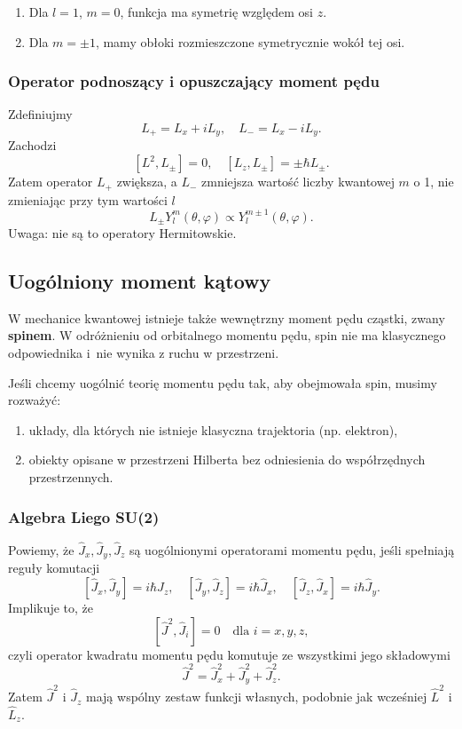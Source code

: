 \begin{enumerate}
\item Dla $l=1$, $m=0$, funkcja ma symetrię względem osi $z$.
\item Dla $m = \pm 1$, mamy obłoki rozmieszczone symetrycznie wokół tej osi.
\end{enumerate}

\subsubsection*{Operator podnoszący i opuszczający moment pędu}
Zdefiniujmy
$$
L_+ = L_x + iL_y, \quad L_- = L_x - iL_y.
$$
Zachodzi
$$
[L^2, L_{\pm}] = 0, \quad [L_z, L_{\pm}] = \pm \hbar L_{\pm}.
$$
Zatem operator $L_+$ zwiększa, a $L_-$ zmniejsza wartość liczby kwantowej $m$ o 1, nie zmieniając przy tym wartości $l$
$$
L_{\pm} Y_l^m(\theta, \varphi) \propto Y_l^{m \pm 1}(\theta, \varphi).
$$
Uwaga: nie są to operatory Hermitowskie.

\subsection{Uogólniony moment kątowy}
W mechanice kwantowej istnieje także wewnętrzny moment pędu cząstki, zwany \textbf{spinem}. W odróżnieniu od orbitalnego momentu pędu, spin nie ma klasycznego odpowiednika i~nie wynika z ruchu w przestrzeni.

Jeśli chcemy uogólnić teorię momentu pędu tak, aby obejmowała spin, musimy rozważyć:
\begin{enumerate}
\item układy, dla których nie istnieje klasyczna trajektoria (np. elektron),
\item obiekty opisane w przestrzeni Hilberta bez odniesienia do współrzędnych przestrzennych.
\end{enumerate}

\subsubsection*{Algebra Liego SU(2)}
Powiemy, że $\hat{J}_x, \hat{J}_y, \hat{J}_z$ są uogólnionymi operatorami
momentu pędu, jeśli spełniają reguły komutacji
$$
[\hat{J}_x, \hat{J}_y] = i\hbar \hat{J}_z, \quad [\hat{J}_y, \hat{J}_z] = i\hbar \hat{J}_x, \quad [\hat{J}_z, \hat{J}_x] = i\hbar \hat{J}_y.
$$
Implikuje to, że
$$
[\hat{J}^2, \hat{J}_i] = 0 \quad \text{dla } i = x, y, z,
$$
czyli operator kwadratu momentu pędu komutuje ze wszystkimi jego składowymi
$$
\hat{J}^2 = \hat{J}_x^2 + \hat{J}_y^2 + \hat{J}_z^2.
$$
Zatem $\hat{J}^2$ i $\hat{J}_z$ mają wspólny zestaw funkcji własnych, podobnie jak wcześniej $\hat{L}^2$ i $\hat{L}_z$.

